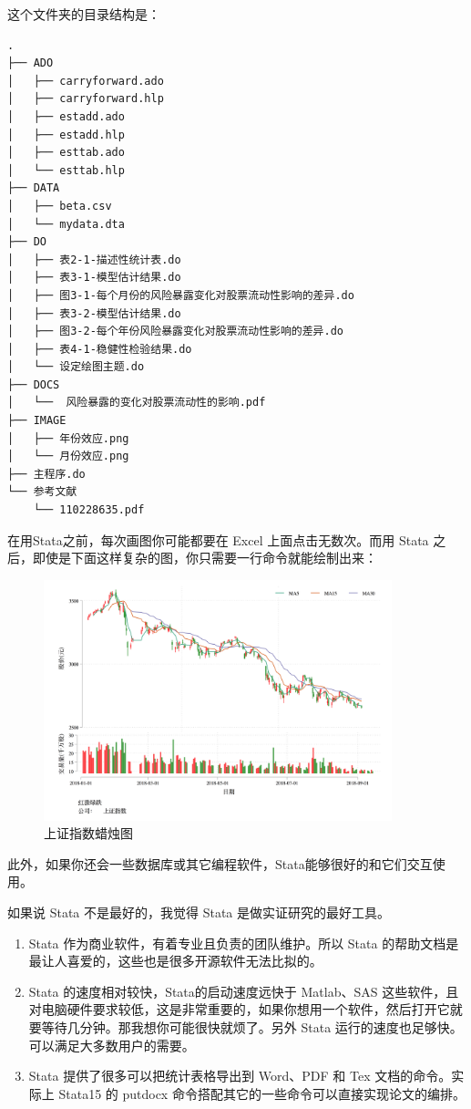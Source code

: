 \documentclass[]{ctexbook}
\providecommand{\tightlist}{%
  \setlength{\itemsep}{0pt}\setlength{\parskip}{0pt}}
\begin{document}
这个文件夹的目录结构是：

\begin{lstlisting}
.
├── ADO
│   ├── carryforward.ado
│   ├── carryforward.hlp
│   ├── estadd.ado
│   ├── estadd.hlp
│   ├── esttab.ado
│   └── esttab.hlp
├── DATA
│   ├── beta.csv
│   └── mydata.dta
├── DO
│   ├── 表2-1-描述性统计表.do
│   ├── 表3-1-模型估计结果.do
│   ├── 图3-1-每个月份的风险暴露变化对股票流动性影响的差异.do
│   ├── 表3-2-模型估计结果.do
│   ├── 图3-2-每个年份风险暴露变化对股票流动性影响的差异.do
│   ├── 表4-1-稳健性检验结果.do
│   └── 设定绘图主题.do
├── DOCS
│   └──  风险暴露的变化对股票流动性的影响.pdf
├── IMAGE
│   ├── 年份效应.png
│   └── 月份效应.png
├── 主程序.do
└── 参考文献
    └── 110228635.pdf
\end{lstlisting}

在用Stata之前，每次画图你可能都要在 Excel 上面点击无数次。而用 Stata 之后，即使是下面这样复杂的图，你只需要一行命令就能绘制出来：

\begin{figure}

{\centering \includegraphics[width=0.9\textwidth]{assets/stkpv4} 

}

\caption{上证指数蜡烛图}\label{fig:sci}
\end{figure}

此外，如果你还会一些数据库或其它编程软件，Stata能够很好的和它们交互使用。

如果说 Stata 不是最好的，我觉得 Stata 是做实证研究的最好工具。

\begin{enumerate}
\def\labelenumi{\arabic{enumi}.}
\tightlist
\item
  Stata 作为商业软件，有着专业且负责的团队维护。所以 Stata 的帮助文档是最让人喜爱的，这些也是很多开源软件无法比拟的。
\item
  Stata 的速度相对较快，Stata的启动速度远快于 Matlab、SAS 这些软件，且对电脑硬件要求较低，这是非常重要的，如果你想用一个软件，然后打开它就要等待几分钟。那我想你可能很快就烦了。另外 Stata 运行的速度也足够快。可以满足大多数用户的需要。
\item
  Stata 提供了很多可以把统计表格导出到 Word、PDF 和 Tex 文档的命令。实际上 Stata15 的 putdocx 命令搭配其它的一些命令可以直接实现论文的编排。
\end{enumerate}
\end{document}
